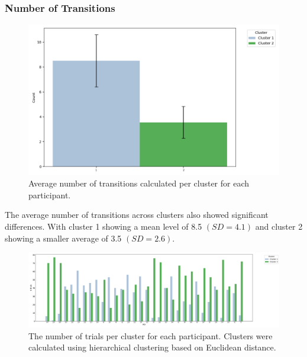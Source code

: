 \documentclass[man, floatsintext]{apa7}
\begin{document}
\subsubsection{Number of Transitions}

\begin{figure}[H]
	\includegraphics[width=\linewidth]{../plots/ALLTRIAL/NTransitions.png}
	\caption{Average number of transitions calculated per cluster for each participant.}
	\label{fig:NTransitionsPerCluster}
\end{figure}

The average number of transitions across clusters also showed significant differences. With cluster 1 showing a mean level of 8.5 $(SD = 4.1)$ and cluster 2 showing a smaller average of 3.5 $(SD = 2.6)$.

\begin{figure}[H]
	\includegraphics[width=\linewidth]{../plots/ALLTRIAL/NTrialsByPID.png}
	\caption{The number of trials per cluster for each participant. Clusters were calculated using hierarchical clustering based on Euclidean distance.}
	\label{fig:NTrialsByPIDPerCluster}
\end{figure}
\end{document}
